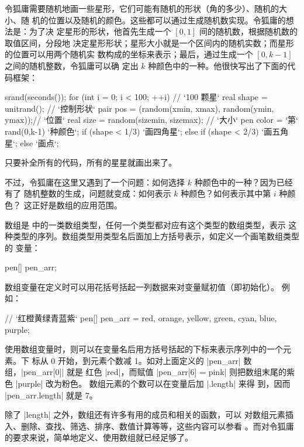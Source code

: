 令狐庸需要随机地画一些星形，它们可能有随机的形状（角的多少）、随机的大小、随
机的位置以及随机的颜色。这些都可以通过生成随机数实现。令狐庸的想法是：为了决
定星形的形状，他首先生成一个 $[0,1]$ 间的随机数，根据随机数的取值区间，分段地
决定星形形状；星形大小就是一个区间内的随机实数；而星形的位置可以用两个随机实
数构成的坐标来表示；最后，通过生成一个 $[0,k-1]$ 之间的随机整数，令狐庸可以确
定出 $k$ 种颜色中的一种。他很快写出了下面的代码框架：
\begin{asycode}
srand(seconds());
for (int i = 0; i < 100; ++i) {                         // `\color{comment}100 颗星`
    real shape = unitrand();                            // `\color{comment}控制形状`
    pair pos = (random(xmin, xmax), random(ymin, ymax));// `\color{comment}位置`
    real size = random(sizemin, sizemax);               // `\color{comment}大小`
    pen color = `第` rand(0,k-1) `种颜色`;
    if (shape < 1/3)
        `画四角星`;
    else if (shape < 2/3)
        `画五角星`;
    else
        `画点`;
}
\end{asycode}
只要补全所有的代码，所有的星星就画出来了。

不过，令狐庸在这里又遇到了一个问题：如何选择 $k$ 种颜色中的一种？因为已经有了
随机整数的生成，问题就变成：如何表示 $k$ 种颜色？如何表示其中第 $i$ 种颜色？
这正好是数组的应用范围。

数组是 \Asy{} 中的一类数组类型，任何一个类型都对应有这个类型的数组类型，表示
这种类型的序列。数组类型用类型名后面加上方括号表示，如定义一个画笔数组类型的
变量：
\begin{asycode}
pen[] pen_arr;
\end{asycode}
数组变量在定义时可以用花括号括起一列数据来对变量赋初值（即初始化）。
例如：
\begin{asycode}
// `\color{comment}红橙黄绿青蓝紫`
pen[] pen_arr = {red, orange, yellow, green, cyan, blue, purple};
\end{asycode}
使用数组变量时，则可以在变量名后用方括号括起的下标来表示序列中的一个元素。下
标从 0 开始，到元素个数减 1。如对上面定义的 |pen_arr| 数组，|pen_arr[0]| 就是
红色 |red|，而赋值 |pen_arr[6] = pink| 则把数组末尾的紫色 |purple| 改为粉色。
数组元素的个数可以在变量后加 |.length|
 来得
到，因而 |pen_arr.length| 就是 7。

除了 |length| 之外，数组还有许多有用的成员和相关的函数，可以
对数组元素插入、删除、查找、筛选、排序、数值计算等等，这些内容可以参看
\cite{asyman}。而对令狐庸的要求来说，简单地定义、使用数组就已经足够了。

